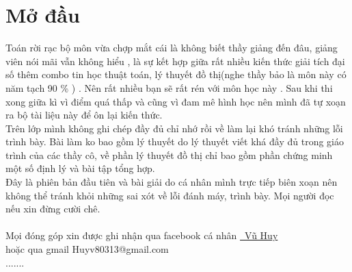 \documentclass[12pt,oneside]{book}
\begin{document}

\tableofcontents


\newpage
\chapter*{Mở đầu}
\indent\vspace{1cm}

\begin{minipage}{15cm}

\hspace{0.5cm}Toán rời rạc bộ môn vừa chợp mắt cái là không biết thầy giảng đến đâu, giảng viên nói mãi vẫn không hiểu \faSmileO, là sự kết hợp giữa rất nhiều kiến thức giải tích đại số thêm combo tin học thuật toán, lý thuyết đồ thị(nghe thầy bảo là môn này có năm tạch 90 \% ) . Nên rất nhiều bạn sẽ rất rén với môn học này \faCommentingO. Sau khi thi xong giữa kì vì điểm quá thấp và cũng vì đam mê hình học nên mình đã tự xoạn ra bộ tài liệu này để ôn lại kiến thức.\\

\indent\hspace{0.5cm} Trên lớp mình không ghi chép đầy đủ chỉ nhớ rồi về làm lại khó tránh những lỗi trình bày. Bài làm ko bao gồm lý thuyết do lý thuyết viết khá đầy đủ trong giáo trình của các thầy cô, về phần lý thuyết đồ thị chỉ bao gồm phần chứng minh một số định lý và bài tập tổng hợp.\faHandORight \faHandOLeft \\

 \indent \hspace{0.5cm} Đây là phiên bản đầu tiên và bài giải do cá nhân mình trực tiếp biên xoạn nên không thể tránh khỏi những sai xót về lỗi đánh máy, trình bày. Mọi người đọc nếu xin đừng cười chê.\\
\\ \indent \hspace{0.5cm}Mọi đóng góp xin được ghi nhận qua facebook cá nhân 
 \href{https://www.facebook.com/profile.php?id=100042139878268}{\color{blue}\faFacebookSquare~Vũ Huy}
\\ \indent \hspace{0.5cm}hoặc qua gmail Huyv80313@gmail.com \color{red}\faEnvelopeO
\\ \indent \hspace{0.8cm} \color{black}{Thân} \color{brown}\faPencil .......
\color{black}{} 

\end{minipage}
\end{document}
